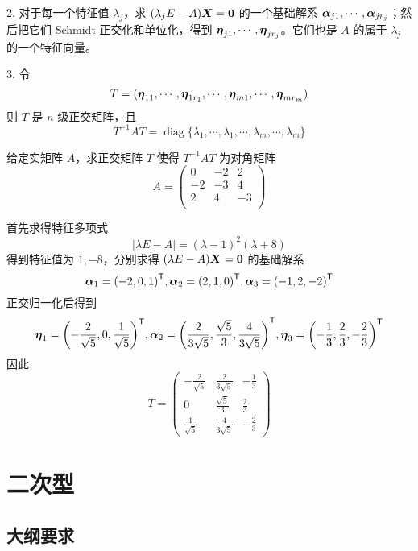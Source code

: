 2. 对于每一个特征值 $\lambda_j$，求 $(\lambda_jE-A)\boldsymbol{X} = \boldsymbol{0}$ 的一个基础解系 $\boldsymbol{\alpha}_{j1},\cdots,\boldsymbol{\alpha}_{jr_j}$；然后把它们 Schmidt 正交化和单位化，得到 $\boldsymbol{\eta}_{j1},\cdots,\boldsymbol{\eta}_{jr_j}$。它们也是 $A$ 的属于 $\lambda_j$ 的一个特征向量。

3. 令
\[ T=(\boldsymbol{\eta}_{11},\cdots,\boldsymbol{\eta}_{1r_1},\cdots,\boldsymbol{\eta}_{m1},\cdots,\boldsymbol{\eta}_{mr_m}) \]
则 $T$ 是 $n$ 级正交矩阵，且
\[ T^{-1}AT = \operatorname{diag}\{\lambda_{1},\cdots,\lambda_{1},\cdots,\lambda_{m},\cdots,\lambda_{m}\} \]

\begin{example}
	给定实矩阵 $A$，求正交矩阵 $T$ 使得 $T^{-1}AT$ 为对角矩阵
	\[ A=\left(
		\begin{matrix}
				0  & -2 & 2  \\
				-2 & -3 & 4  \\
				2  & 4  & -3 \\
			\end{matrix}
		\right) \]
\end{example}

\begin{solution}
	首先求得特征多项式
	\[ |\lambda E - A| = (\lambda-1)^2(\lambda+8) \]
	得到特征值为 $1, -8$，分别求得 $(\lambda E - A) \boldsymbol{X} = \boldsymbol{0}$ 的基础解系
	\[ \boldsymbol{\alpha}_1 = {(-2, 0, 1)}^\mathsf{T}, \boldsymbol{\alpha}_2 = {(2, 1, 0)}^\mathsf{T}, \boldsymbol{\alpha}_3 = {(-1, 2, -2)}^\mathsf{T} \]
	正交归一化后得到
	\[ \boldsymbol{\eta}_1 = {\left(-\frac{2}{\sqrt{5}}, 0, \frac{1}{\sqrt{5}}\right)}^\mathsf{T}, \boldsymbol{\alpha}_2 = {\left(\frac{2}{3\sqrt{5}}, \frac{\sqrt{5}}{3}, \frac{4}{3 \sqrt{5}}\right)}^\mathsf{T}, \boldsymbol{\eta}_3 = {\left(-\frac{1}{3}, \frac{2}{3}, -\frac{2}{3}\right)}^\mathsf{T} \]
	因此
	\[ T = \left(\begin{matrix}
				-\frac{2}{\sqrt{5}} & \frac{2}{3\sqrt{5}}  & -\frac{1}{3} \\
				0                   & \frac{\sqrt{5}}{3}   & \frac{2}{3}  \\
				\frac{1}{\sqrt{5}}  & \frac{4}{3 \sqrt{5}} & -\frac{2}{3}
			\end{matrix}\right) \]
\end{solution}

\section{二次型}

\subsection{大纲要求}

